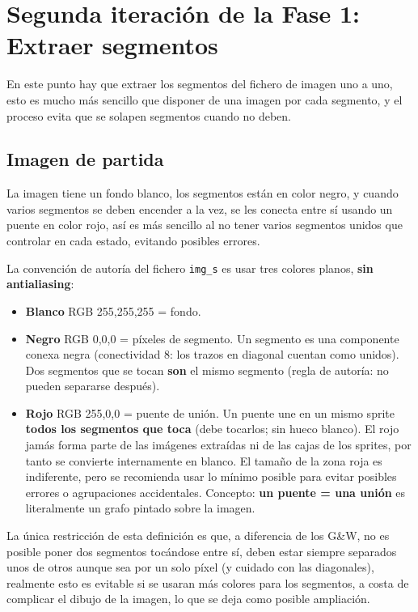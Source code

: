 \section{Segunda iteración de la Fase 1: Extraer segmentos}
\label{sec:segunda_iteracion}

En este punto hay que extraer los segmentos del fichero de imagen uno a uno, esto es mucho más sencillo que disponer de una imagen por cada segmento, y el proceso evita que se solapen segmentos cuando no deben.

\subsection{Imagen de partida}

La imagen tiene un fondo blanco, los segmentos están en color negro, y cuando varios segmentos se deben encender a la vez, se les conecta entre sí usando un puente en color rojo, así es más sencillo al no tener varios segmentos unidos que controlar en cada estado, evitando posibles errores.

La convención de autoría del fichero \texttt{img\_s} es usar tres colores planos, \textbf{sin antialiasing}:

\begin{itemize}
	\item \textbf{Blanco} RGB 255,255,255 = fondo.
	\item \textbf{Negro} RGB 0,0,0 = píxeles de segmento. Un segmento es una componente conexa negra (conectividad 8: los trazos en diagonal cuentan como unidos). Dos segmentos que se tocan \textbf{son} el mismo segmento (regla de autoría: no pueden separarse después). 
	\item \textbf{Rojo} RGB 255,0,0 = puente de unión. Un puente une en un mismo sprite \textbf{todos los segmentos que toca} (debe tocarlos; sin hueco blanco). El rojo jamás forma parte de las imágenes extraídas ni de las cajas de los sprites, por tanto se convierte internamente en blanco. El tamaño de la zona roja es indiferente, pero se recomienda usar lo mínimo posible para evitar posibles errores o agrupaciones accidentales. Concepto: \textbf{un puente = una unión} es literalmente un grafo pintado sobre la imagen.
\end{itemize}

La única restricción de esta definición es que, a diferencia de los G\&W, no es posible poner dos segmentos tocándose entre sí, deben estar siempre separados unos de otros aunque sea por un solo píxel (y cuidado con las diagonales), realmente esto es evitable si se usaran más colores para los segmentos, a costa de complicar el dibujo de la imagen, lo que se deja como posible ampliación.

